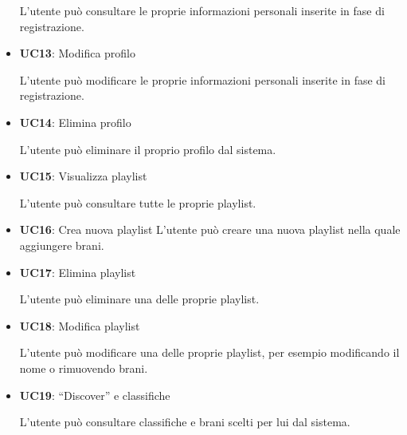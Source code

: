 \begin{itemize}
      L'utente può consultare le proprie informazioni personali inserite in fase di registrazione.
      \item \textbf{UC13}: Modifica profilo 
      
      L'utente può modificare le proprie informazioni personali inserite in fase di registrazione.
      \item \textbf{UC14}: Elimina profilo 
      
      L'utente può eliminare il proprio profilo dal sistema.
      \item \textbf{UC15}: Visualizza playlist 
      
      L'utente può consultare tutte le proprie playlist.
      \item \textbf{UC16}: Crea nuova playlist L'utente può creare una nuova playlist nella
            quale aggiungere brani.
      \item \textbf{UC17}: Elimina playlist 
      
      L'utente può eliminare una delle proprie playlist.
      \item \textbf{UC18}: Modifica playlist 
      
      L'utente può modificare una delle proprie playlist, per esempio modificando il nome o rimuovendo brani.
      \item \textbf{UC19}: ``Discover'' e classifiche 
      
      L'utente può consultare classifiche e brani scelti per lui dal sistema.

\end{itemize}

